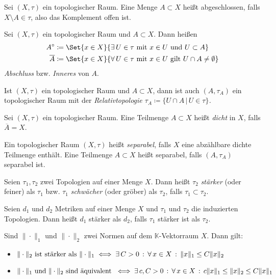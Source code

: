 \documentclass{cheat-sheet}
\newcommand{\K}{\mathbb{K}}
\begin{document}
\begin{defn}
  Sei $(X, \tau)$ ein topologischer Raum. Eine Menge $A \subset X$ heißt abgeschlossen, falls $X \setminus A \in \tau$, also das Komplement offen ist.
\end{defn}

\begin{defn}
  Sei $(X, \tau)$ ein topologischer Raum und $A \subset X$. Dann heißen
  \begin{align*}
    A^{\circ} &\coloneqq \Set{ x \in X }{ \exists\,U \in \tau \text{ mit } x \in U \text{ und } U \subset A } \\
    \overline{A} &\coloneqq \Set{ x \in X }{ \forall\,U \in \tau \text{ mit } x \in U \text{ gilt } U \cap A \not= \emptyset }
  \end{align*}
  \emph{Abschluss} bzw. \emph{Inneres} von $A$.
\end{defn}

\begin{defn}
  Ist $(X, \tau)$ ein topologischer Raum und $A \subset X$, dann ist auch $(A, \tau_A)$ ein topologischer Raum mit der \em{Relativtopologie} $\tau_A \coloneqq \{ U \cap A \,|\,U \in \tau \}$.
\end{defn}

\begin{defn}
  Sei $(X, \tau)$ ein topologischer Raum. Eine Teilmenge $A \subset X$ heißt \emph{dicht} in $X$, falls $\overline{A} = X$.
\end{defn}

\begin{defn}
  Ein topologischer Raum $(X, \tau)$ heißt \emph{separabel}, falls $X$ eine abzählbare dichte Teilmenge enthält. Eine Teilmenge $A \subset X$ heißt separabel, falls $(A, \tau_A)$ separabel ist.
\end{defn}

\begin{defn}
  Seien $\tau_1, \tau_2$ zwei Topologien auf einer Menge $X$. Dann heißt $\tau_2$ \emph{stärker} (oder feiner) als $\tau_1$ bzw. $\tau_1$ \emph{schwächer} (oder gröber) als $\tau_2$, falls $\tau_1 \subset \tau_2$.
\end{defn}

\begin{defn}
  Seien $d_1$ und $d_2$ Metriken auf einer Menge $X$ und $\tau_1$ und $\tau_2$ die induzierten Topologien. Dann heißt $d_1$ stärker als $d_2$, falls $\tau_1$ stärker ist als $\tau_2$.
\end{defn}

\begin{satz}
  Sind $\| \cdot \|_1$ und $\| \cdot \|_2$ zwei Normen auf dem $\K$-Vektorraum $X$. Dann gilt:
  \begin{itemize}
    \item $\| \cdot \|_2 \text{ ist stärker als } \| \cdot \|_1 \iff \exists \, {C > 0} \,:\, \forall \, {x \in X} \,:\, \| x \|_1 \leq C \| x \|_2$
    \item $\| \cdot \|_1 \text{ und } \| \cdot \|_2 \text{ sind äquivalent } \iff \exists \, {c, C > 0} \,:\, \forall \, {x \in X} \,:\, c \| x \|_1 \leq \| x \|_2 \leq C \| x \|_1$
  \end{itemize}
\end{satz}
\end{document}
